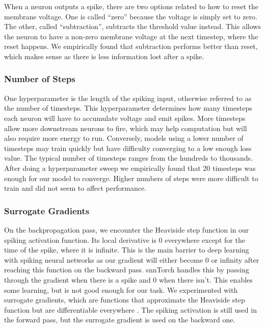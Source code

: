 \documentclass [MS] {UCLAthesis}
\begin{document}
When a neuron outputs a spike, there are two options related to how to reset the membrane voltage. One is called ``zero'' because the voltage is simply set to zero. The other, called ``subtraction'', subtracts the threshold value instead. This allows the neuron to have a non-zero membrane voltage at the next timestep, where the reset happens. We empirically found that subtraction performs better than reset, which makes sense as there is less information lost after a spike.

\subsubsection{Number of Steps}

One hyperparameter is the length of the spiking input, otherwise referred to as the number of timesteps. This hyperparameter determines how many timesteps each neuron will have to accumulate voltage and emit spikes. More timesteps allow more downstream neurons to fire, which may help computation but will also require more energy to run. Conversely, models using a lower number of timesteps may train quickly but have difficulty converging to a low enough loss value. The typical number of timesteps ranges from the hundreds to thousands. After doing a hyperparameter sweep we empirically found that 20 timesteps was enough for our model to converge. Higher numbers of steps were more difficult to train and did not seem to affect performance.



\subsubsection{Surrogate Gradients}

On the backpropagation pass, we encounter the Heaviside step function in our spiking activation function. Its local derivative is 0 everywhere except for the time of the spike, where it is infinite. This is the main barrier to deep learning with spiking neural networks as our gradient will either become 0 or infinity after reaching this function on the backward pass. snnTorch handles this by passing through the gradient when there is a spike and 0 when there isn’t. This enables some learning, but is not good enough for our task. We experimented with surrogate gradients, which are functions that approximate the Heaviside step function but are differentiable everywhere \citep{surrogate_grad}. The spiking activation is still used in the forward pass, but the surrogate gradient is used on the backward one.
\end{document}

